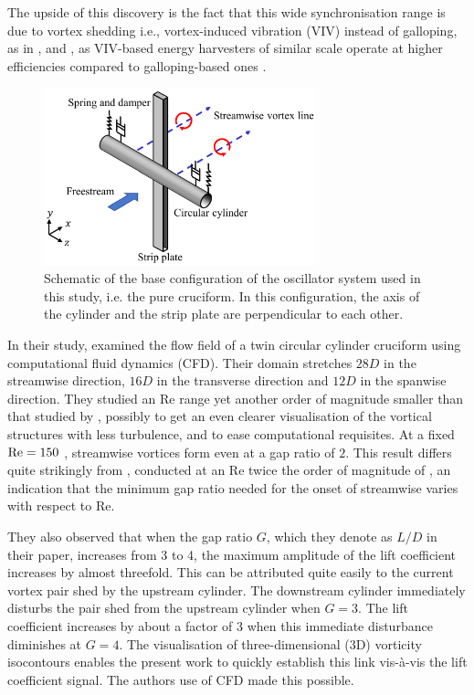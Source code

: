 \documentclass[oneside]{utmthesis}
\begin{document}
The upside of this discovery is the fact that this wide synchronisation range is due to vortex shedding i.e., vortex-induced vibration (VIV) instead of galloping, as in \citet{Sun2019b}, \citet{Xu2019} and \citet{Ding2019}, as VIV-based energy harvesters of similar scale operate at higher efficiencies compared to galloping-based ones \citep{Sun2016,Ma2016}.

\begin{figure}
  \centering
  \hspace{1cm} \includegraphics[width=0.7\textwidth]{figs/oscillatorSchematic}
  \caption{Schematic of the base configuration of the oscillator system used in this study, i.e. the pure cruciform. In this configuration, the axis of the cylinder and the strip plate are perpendicular to each other.}
  \label{fig:oscillatorSchematic}
\end{figure}

In their study, \citet{Deng2007} examined the flow field of a twin circular cylinder cruciform using computational fluid dynamics (CFD). Their domain stretches  $28D$  in the streamwise direction,  $16D$  in the transverse direction and  $12D$  in the spanwise direction. They studied an Re range yet another order of magnitude smaller than that studied by \citet{Koide2017}, possibly to get an even clearer visualisation of the vortical structures with less turbulence, and to ease computational requisites. At a fixed  $\text{Re} = 150$ , streamwise vortices form even at a gap ratio of $2$. This result differs quite strikingly from \citet{Koide2006,Koide2007}, conducted at an Re twice the order of magnitude of \citet{Deng2007}, an indication that the minimum gap ratio needed for the onset of streamwise varies with respect to Re.

They also observed that when the gap ratio $G$, which they denote as  $L/D$  in their paper, increases from 3 to 4, the maximum amplitude of the lift coefficient increases by almost threefold. This can be attributed quite easily to the current vortex pair shed by the upstream cylinder. The downstream cylinder immediately disturbs the pair shed from the upstream cylinder when  $G=3$. The lift coefficient increases by about a factor of 3 when this immediate disturbance diminishes at  $G=4$. The visualisation of three-dimensional (3D) vorticity isocontours enables the present work to quickly establish this link vis-\`{a}-vis the lift coefficient signal. The authors use of CFD made this possible.
\end{document}
